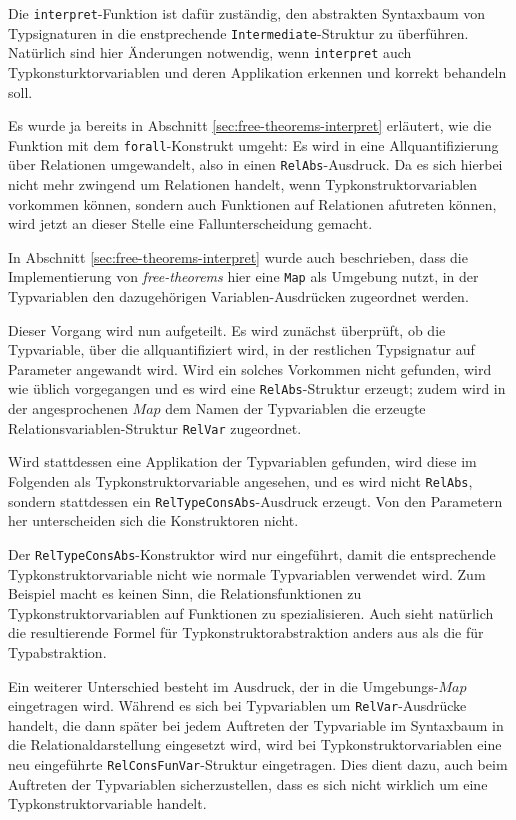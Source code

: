 Die \texttt{interpret}-Funktion ist dafür zuständig, den abstrakten Syntaxbaum von Typ\-sig\-na\-tu\-ren in die enstprechende
\texttt{Intermediate}-Struktur zu überführen. Natürlich sind hier Änderungen notwendig, wenn \texttt{interpret} auch
Typkonsturktorvariablen und deren Applikation erkennen und korrekt behandeln soll.

Es wurde ja bereits in Abschnitt \ref{sec:free-theorems-interpret} erläutert, wie die Funktion mit dem \texttt{forall}-Konstrukt
umgeht: Es wird in eine Allquantifizierung über Relationen umgewandelt, also in einen \texttt{RelAbs}-Ausdruck.
Da es sich hierbei nicht mehr zwingend um Relationen handelt, wenn Typkonstruktorvariablen vorkommen können, sondern auch
Funktionen auf Relationen afutreten können, wird jetzt an dieser Stelle eine Fallunterscheidung gemacht.

In Abschnitt \ref{sec:free-theorems-interpret} wurde auch beschrieben, dass die Implementierung von \textit{free-theorems} hier eine
\texttt{Map} als Umgebung nutzt, in der Typvariablen den dazugehörigen Variablen-Ausdrücken zugeordnet werden.

Dieser Vorgang wird nun aufgeteilt. Es wird zunächst überprüft, ob die Typvariable, über die allquantifiziert wird, in der
restlichen Typsignatur auf Parameter angewandt wird. Wird ein solches Vorkommen nicht gefunden, wird wie üblich vorgegangen
und es wird eine \texttt{RelAbs}-Struktur erzeugt; zudem wird in der angesprochenen $Map$ dem Namen der Typvariablen
die erzeugte Relationsvariablen-Struktur \texttt{RelVar} zugeordnet.

Wird stattdessen eine Applikation der Typvariablen gefunden, wird diese im Folgenden als Typkonstruktorvariable angesehen,
und es wird nicht \texttt{RelAbs}, sondern stattdessen ein \texttt{RelTypeConsAbs}-Ausdruck erzeugt.
Von den Parametern her unterscheiden sich die Konstruktoren nicht.

Der \texttt{RelTypeConsAbs}-Konstruktor wird nur
eingeführt, damit die entsprechende Typkonstruktorvariable nicht wie normale Typvariablen verwendet wird.
Zum Beispiel macht es keinen Sinn, die Relationsfunktionen zu Typkonstruktorvariablen auf
Funktionen zu spezialisieren. Auch sieht natürlich die resultierende Formel für Typkonstruktorabstraktion anders aus als die
für Typabstraktion.

Ein weiterer Unterschied besteht im Ausdruck, der in die Umgebungs-$Map$ eingetragen wird. Während es sich bei
Typvariablen um \texttt{RelVar}-Ausdrücke handelt, die dann später bei jedem Auftreten der Typvariable im Syntaxbaum
in die Relationaldarstellung eingesetzt wird, wird bei Typkonstruktorvariablen eine neu eingeführte
\texttt{RelConsFunVar}-Struktur eingetragen.
Dies dient dazu, auch beim Auftreten der Typvariablen sicherzustellen, dass es sich nicht wirklich um eine
Typkonstruktorvariable handelt.

